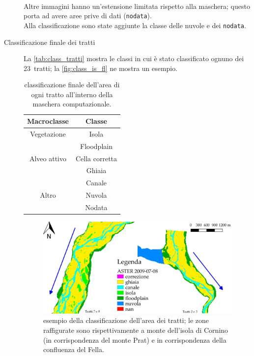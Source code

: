 \begin{description}
	\\
	Altre immagini hanno un'estensione limitata rispetto alla maschera; questo porta ad avere aree prive di dati (\texttt{nodata}).
	\\
	Alla classificazione sono state aggiunte la classe delle nuvole e dei \texttt{nodata}.
	\item[Classificazione finale dei tratti] La \vref{tab:class_tratti} mostra le classi in cui è stato classificato ognuno dei 23~tratti; la \vref{fig:class_is_fl} ne mostra un esempio.
	\begin{table}[ht]
		\centering
		\begin{tabular}{
			c 
			c
			}
			\toprule
			\textbf{Macroclasse}	&	\textbf{Classe}	\\
			\midrule
			Vegetazione		&	Isola	\\
							&	Floodplain	\\
			Alveo attivo	&	Cella corretta	\\
							&	Ghiaia	\\
							&	Canale	\\
			Altro			&	Nuvola	\\
							&	Nodata	\\
			\bottomrule
		\end{tabular}
		\caption[classificazione dell'area dei tratti]{classificazione finale dell'area di ogni tratto all'interno della maschera computazionale.}
		\label{tab:class_tratti}
	\end{table}
	\begin{figure}[ht]
		\centering
		\includegraphics[width=\textwidth]{files/esempio_class_is_fl.jpeg}
		\caption[esempio della classificazione dell'area dei tratti]{esempio della classificazione dell'area dei tratti; le zone raffigurate sono rispettivamente a monte dell'isola di Cornino (in corrispondenza del monte Prat) e in corrispondenza della confluenza del Fella.}
		\label{fig:class_is_fl}
	\end{figure}


\end{description}
